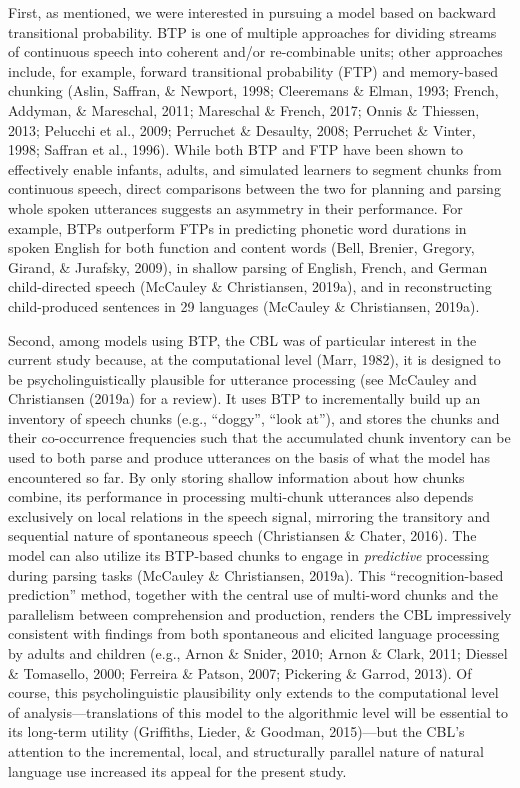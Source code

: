 \documentclass[
  english,
  man,floatsintext]{apa6}
\begin{document}
First, as mentioned, we were interested in pursuing a model based on backward transitional probability. BTP is one of multiple approaches for dividing streams of continuous speech into coherent and/or re-combinable units; other approaches include, for example, forward transitional probability (FTP) and memory-based chunking (Aslin, Saffran, \& Newport, 1998; Cleeremans \& Elman, 1993; French, Addyman, \& Mareschal, 2011; Mareschal \& French, 2017; Onnis \& Thiessen, 2013; Pelucchi et al., 2009; Perruchet \& Desaulty, 2008; Perruchet \& Vinter, 1998; Saffran et al., 1996). While both BTP and FTP have been shown to effectively enable infants, adults, and simulated learners to segment chunks from continuous speech, direct comparisons between the two for planning and parsing whole spoken utterances suggests an asymmetry in their performance. For example, BTPs outperform FTPs in predicting phonetic word durations in spoken English for both function and content words (Bell, Brenier, Gregory, Girand, \& Jurafsky, 2009), in shallow parsing of English, French, and German child-directed speech (McCauley \& Christiansen, 2019a), and in reconstructing child-produced sentences in 29 languages (McCauley \& Christiansen, 2019a).

Second, among models using BTP, the CBL was of particular interest in the current study because, at the computational level (Marr, 1982), it is designed to be psycholinguistically plausible for utterance processing (see McCauley and Christiansen (2019a) for a review). It uses BTP to incrementally build up an inventory of speech chunks (e.g., \enquote{doggy}, \enquote{look at}), and stores the chunks and their co-occurrence frequencies such that the accumulated chunk inventory can be used to both parse and produce utterances on the basis of what the model has encountered so far. By only storing shallow information about how chunks combine, its performance in processing multi-chunk utterances also depends exclusively on local relations in the speech signal, mirroring the transitory and sequential nature of spontaneous speech (Christiansen \& Chater, 2016). The model can also utilize its BTP-based chunks to engage in \emph{predictive} processing during parsing tasks (McCauley \& Christiansen, 2019a). This \enquote{recognition-based prediction} method, together with the central use of multi-word chunks and the parallelism between comprehension and production, renders the CBL impressively consistent with findings from both spontaneous and elicited language processing by adults and children (e.g., Arnon \& Snider, 2010; Arnon \& Clark, 2011; Diessel \& Tomasello, 2000; Ferreira \& Patson, 2007; Pickering \& Garrod, 2013). Of course, this psycholinguistic plausibility only extends to the computational level of analysis---translations of this model to the algorithmic level will be essential to its long-term utility (Griffiths, Lieder, \& Goodman, 2015)---but the CBL's attention to the incremental, local, and structurally parallel nature of natural language use increased its appeal for the present study.
\end{document}
